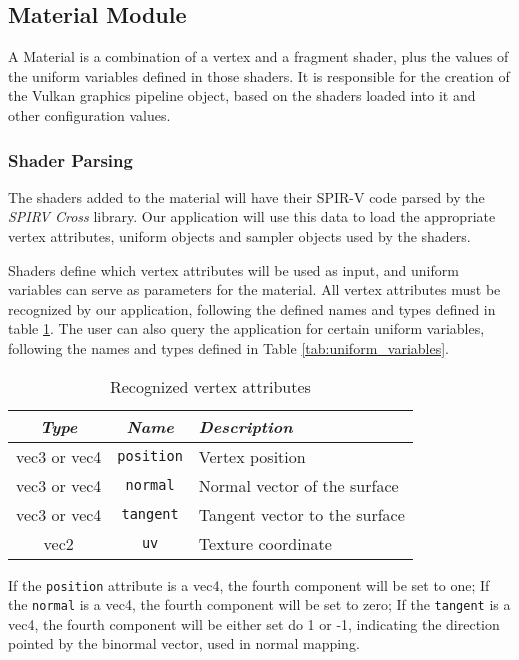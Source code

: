 \subsection{Material Module}
A Material is a combination of a vertex and a fragment shader, plus the values of the uniform variables defined in those shaders. It is responsible for the creation of the Vulkan graphics pipeline object, based on the shaders loaded into it and other configuration values.

\subsubsection{Shader Parsing}
The shaders added to the material will have their SPIR-V code parsed by the \emph{SPIRV Cross} library. Our application will use this data to load the appropriate vertex attributes, uniform objects and sampler objects used by the shaders.

Shaders define which vertex attributes will be used as input, and uniform variables can serve as parameters for the material. All vertex attributes must be recognized by our application, following the defined names and types defined in table \ref{tab:vertex_attributes}. The user can also query the application for certain uniform variables, following the names and types defined in Table \ref{tab:uniform_variables}.

\begin{table}[h]
    \centering
    \caption{Recognized vertex attributes}
    \begin{tabular}{|c|c|p{6cm}|}
    \hline
        \textit{Type} & \textit{Name} & \textit{Description} \\
        \hline \hline
        vec3 or vec4 & \texttt{position} & Vertex position \\
        vec3 or vec4 & \texttt{normal} & Normal vector of the surface \\
        vec3 or vec4 & \texttt{tangent} & Tangent vector to the surface \\
        vec2 & \texttt{uv} & Texture coordinate \\
        \hline
    \end{tabular}
    \label{tab:vertex_attributes}
\end{table}

If the \texttt{position} attribute is a vec4, the fourth component will be set to one; If the \texttt{normal} is a vec4, the fourth component will be set to zero; If the \texttt{tangent} is a vec4, the fourth component will be either set do 1 or -1, indicating the direction pointed by the binormal vector, used in normal mapping.

